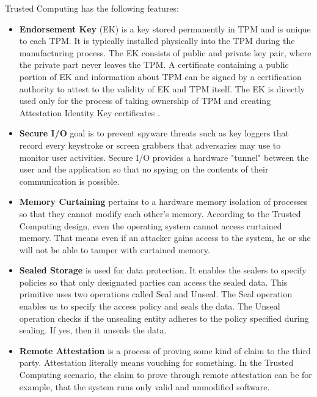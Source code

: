 Trusted Computing has the following features:

\begin{itemize}

\item \textbf{Endorsement Key} (EK) is a key stored permanently in TPM and is unique to each TPM. It is typically installed physically into the TPM during the manufacturing process. The EK consists of public and private key pair, where the private part never leaves the TPM. A certificate containing a public portion of EK and information about TPM can be signed by a certification authority to attest to the validity of EK and TPM itself. The EK is directly used only for the process of taking ownership of TPM and creating Attestation Identity Key  certificates \cite[p.~179-180]{Tomlinson2017}.

\item \textbf{Secure I/O} goal is to prevent spyware threats such as key loggers that record every keystroke or screen grabbers that adversaries may use to monitor user activities. Secure I/O provides a hardware "tunnel" between the user and the application so that no spying on the contents of their communication is possible.

\item \textbf{Memory Curtaining} pertains to a hardware memory isolation of processes so that they cannot modify each other's memory. According to the Trusted Computing design, even the operating system cannot access curtained memory. That means even if an attacker gains access to the system, he or she will not be able to tamper with curtained memory.

\item \textbf{Sealed Storage} is used for data protection. It enables the sealers to specify policies so that only designated parties can access the sealed data. This primitive uses two operations called Seal and Unseal. The Seal operation enables us to specify the access policy and seals the data. The Unseal operation checks if the unsealing entity adheres to the policy specified during sealing. If yes, then it unseals the data.

\item \textbf{Remote Attestation} is a process of proving some kind of claim to the third party. Attestation literally means vouching for something. In the Trusted Computing scenario, the claim to prove through remote attestation can be for example, that the system runs only valid and unmodified software.

\end{itemize}


